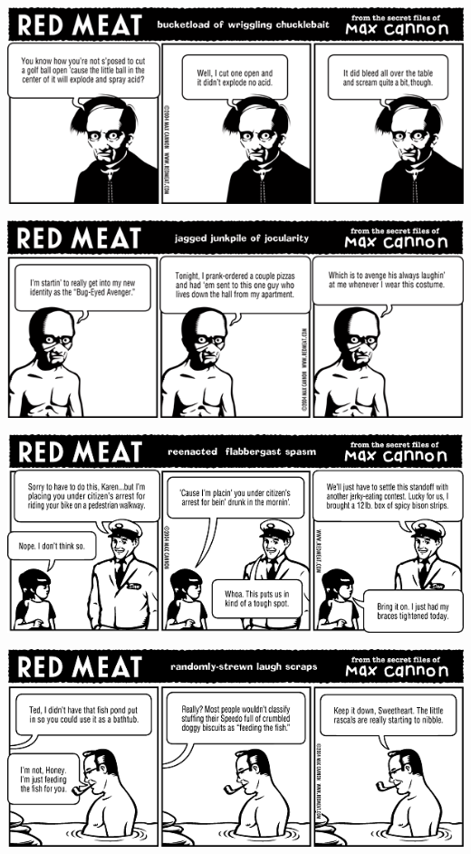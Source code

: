 \documentclass[a4paper,twoside,11pt]{article}
\begin{document}
\includegraphics[width=\textwidth]{redmeat_2004-07-06.png}



\includegraphics[width=\textwidth]{redmeat_2004-07-13.png}



\includegraphics[width=\textwidth]{redmeat_2004-07-20.png}



\includegraphics[width=\textwidth]{redmeat_2004-07-27.png}
\end{document}
